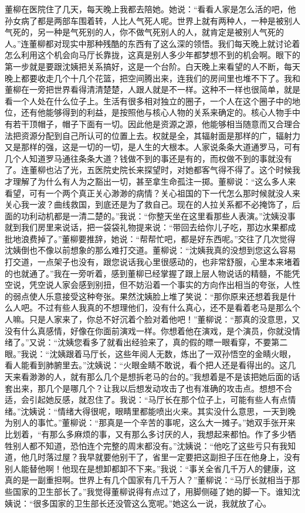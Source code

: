 \documentclass[12pt,oneside]{book}
\begin{document}
董柳在医院住了几天，每天晚上我都去陪她。她说：``看看人家是怎么活的吧，他孙女病了都是两部车围着转，人比人气死人呢。世界上就有两种人，一种是被别人气死的，另一种是气死别的人，你不做气死别人的人，就肯定是被别人气死的人。''连董柳都对现实中那种残酷的东西有了这么深的领悟。我们每天晚上就讨论着怎么利用这个机会向马厅长靠拢，这真是别人多少年都梦想不到的机会啊。眼下的第一步就是要跟沈姨把关系搞好，这是一个台阶。白天晚上来看望的人不断，每天晚上都要收走几个十几个花篮，把空间腾出来，连我们的房间里也堆不下了。我和董柳在一旁把世界看得清清楚楚，人跟人就是不一样。这种不一样也很简单，就是看一个人处在什么位子上。生活有很多相对独立的圈子，一个人在这个圈子中的地位，还有他能够得到的利益，是按照他与核心人物的关系来确定的。核心人物手中有若干顶帽子，帽子下面有一切。因此他是资源之源，他能够相当随意而又合理合法把资源分配到自己所认可的位置上去。权就是全，其辐射面是那样的广，辐射力又是那样的强，这是一切的一切，是人生的大根本。人家说条条大道通罗马，可有几个人知道罗马通往条条大道？钱做不到的事还是有的，而权做不到的事就没有了。连董柳也沾了光，五医院史院长来探望时，对她都客气得不得了。这个时候我才理解了为什么有人为之豁出一切，甚至拿生命孤注一掷。董柳说：``这么多人来看望，可有一个两个真正关心渺渺的病情？关心祖国的下一代怎么那时候就没人来关心我一波？曲线救国，到底还是为了救自己。现在的人拉关系都不必掩饰了，后面的功利动机都是一清二楚的。''我说：``你整天坐在这里看那些人表演。''沈姨没事就到我们房里来说话，把一袋袋礼物提来说：``带回去给你儿子吃，那边水果都成批地浪费掉了。''董柳要推辞，她说：``帮帮忙吧，都是好东西呢。''交往了几次觉得沈姨倒也不像以前想象的那么难打交道。董柳说：``沈姨我真的没想到您这么容易打交道，一点架子也没有，跟您说话我心里很感动的，也非常舒服，心里本来堵着的也就通了。''我在一旁听着，感到董柳已经掌握了跟上层人物说话的精髓，不能凭空说，凭空说人家会感到别扭，但不妨沿着一个事实的方向作出相当的夸张，人性的弱点使人乐意接受这种夸张。果然沈姨脸上堆了笑说：``那你原来还想着我是什么人吧。不过有些人我真的不想理他们，没有什么真心，还不是看着老马是那么个人嘛。只是人家来了，你总不好沉着个脸对着他吧！''董柳说：``那真的没意思，又没有什么真感情，好像在你面前演戏一样。你想着他在演戏，是个演员，你就没情绪了。''又说：``沈姨您看多了就看出经验来了，真的假的瞟一眼看穿，不要第二眼。''我说：``沈姨跟着马厅长，这些年阅人无数，炼出了一双孙悟空的金睛火眼，看人能看到肺腑里去。''沈姨说：``火眼金睛不敢说，看个把人还是看得出的。这几天来看渺渺的人，就有那么几个是想拆老马的台的。''我想着是不是该把她后面的话套出来，那几个是哪几个？让我以后想发动攻击了也有准确的攻击点。想想不合适，会引起她反感，就忍住了。我说：``马厅长在那个位子上，可能有些人有点情绪。''沈姨说：``情绪大得很呢，眼睛里都能喷出火来。其实没什么意思，一天到晚为别人的事忙。''董柳说：``那真是一个辛苦的事呢，这么大一摊子。''她双手张开来比划着，``有那么多麻烦的事，又有那么多讨厌的人，我想起来都怕。作了多少牺牲别人都不知道，恐怕连个完整的周末都没有。''沈姨说：``他吃了这些亏只有我知道，他几时落过屋？我早就要他别干了，省里一定要把这副担子压在他身上，没有别人能替他啊！他现在是想卸都卸不下来。''我说：``事关全省几千万人的健康，这真的是一副重担啊。世界上有几个国家有几千万人？''董柳说：``马厅长就相当于那些国家的卫生部长了。''我觉得董柳说得有点过了，用脚侧碰了她的脚一下。谁知沈姨说：``很多国家的卫生部长还没管这么宽呢。''她这么一说，我就放了心。
\end{document}
